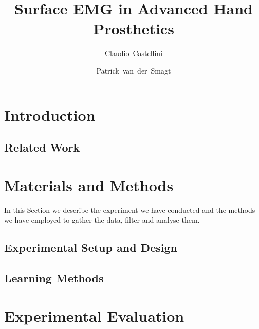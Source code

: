 \documentclass[twocolumn,referee]{svjour2}
\begin{document}
\title{Surface EMG in Advanced Hand Prosthetics}

\author{Claudio~Castellini \and Patrick~van~der~Smagt}

\maketitle

\begin{abstract}
  
\end{abstract}


\section{Introduction}
\label{sec:introduction}


\subsection{Related Work}
\label{subsec:relatedwork}


\section{Materials and Methods}
\label{sec:m&ms}

In this Section we describe the experiment we have conducted and the
methods we have employed to gather the data, filter and analyse them.

\subsection{Experimental Setup and Design}
\label{subsec:setup}


\subsection{Learning Methods}
\label{subsec:analysis}


\section{Experimental Evaluation}
\label{sec:exp}
\end{document}
